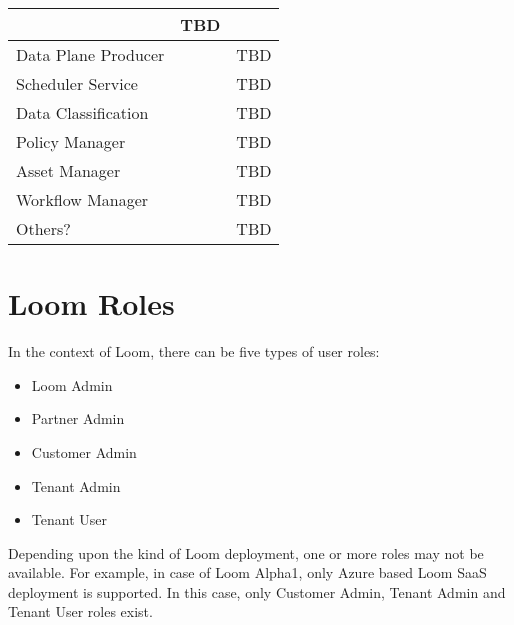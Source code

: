 \documentclass[letterpaper,10pt,english]{sphinxmanual}
\begin{document}
\begin{savenotes}
\begin{tabulary}{\linewidth}[t]{|T|T|T|}
&
TBD
\\
\hline
Data Plane Producer
&
&
TBD
\\
\hline
Scheduler Service
&
&
TBD
\\
\hline
Data Classification
&
&
TBD
\\
\hline
Policy Manager
&
&
TBD
\\
\hline
Asset Manager
&
&
TBD
\\
\hline
Workflow Manager
&
&
TBD
\\
\hline
Others?
&
&
TBD
\\
\hline
\end{tabulary}
\par
\sphinxattableend\end{savenotes}


\section{Loom Roles}
\label{\detokenize{mcdmp_concepts:content-loom-roles}}\label{\detokenize{mcdmp_concepts:loom-roles}}
In the context of Loom, there can be five types of user roles:
\begin{itemize}
\item {} 
Loom Admin

\item {} 
Partner Admin

\item {} 
Customer Admin

\item {} 
Tenant Admin

\item {} 
Tenant User

\end{itemize}

Depending upon the kind of Loom deployment, one or more roles may not be available.  For example, in case of Loom Alpha1, only Azure based Loom SaaS deployment is supported.  In this case, only Customer Admin, Tenant Admin and Tenant User roles exist.
\end{document}
